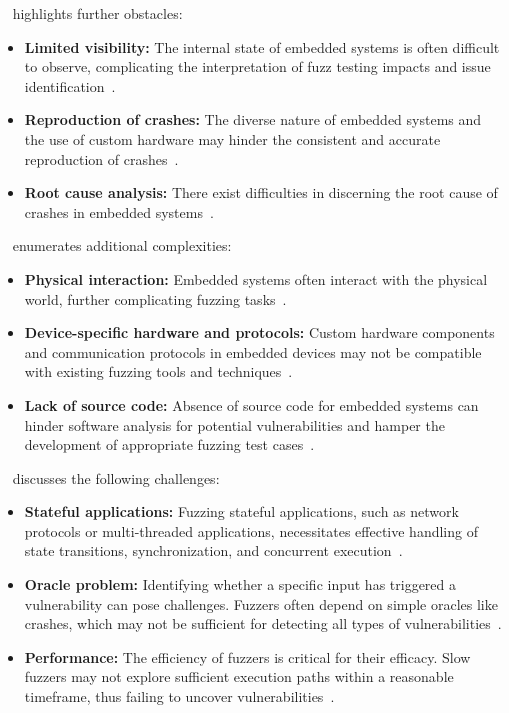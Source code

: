 ~ highlights further obstacles:
\begin{itemize}
\item \textbf{Limited visibility:} The internal state of embedded systems is often difficult to observe, complicating the interpretation of fuzz testing impacts and issue identification~\cite{muench2018you}.
\item \textbf{Reproduction of crashes:} The diverse nature of embedded systems and the use of custom hardware may hinder the consistent and accurate reproduction of crashes~\cite{muench2018you}.
\item \textbf{Root cause analysis:} There exist difficulties in discerning the root cause of crashes in embedded systems~\cite{muench2018you}.
\end{itemize}

~ enumerates additional complexities:
\begin{itemize}
\item \textbf{Physical interaction:} Embedded systems often interact with the physical world, further complicating fuzzing tasks~\cite{eisele2022embedded}.
\item \textbf{Device-specific hardware and protocols:} Custom hardware components and communication protocols in embedded devices may not be compatible with existing fuzzing tools and techniques~\cite{eisele2022embedded}.
\item \textbf{Lack of source code:} Absence of source code for embedded systems can hinder software analysis for potential vulnerabilities and hamper the development of appropriate fuzzing test cases~\cite{eisele2022embedded}.
\end{itemize}

~ discusses the following challenges:
\begin{itemize}
\item \textbf{Stateful applications:} Fuzzing stateful applications, such as network protocols or multi-threaded applications, necessitates effective handling of state transitions, synchronization, and concurrent execution~\cite{manes2019art}.
\item \textbf{Oracle problem:} Identifying whether a specific input has triggered a vulnerability can pose challenges. Fuzzers often depend on simple oracles like crashes, which may not be sufficient for detecting all types of vulnerabilities~\cite{manes2019art}.
\item \textbf{Performance:} The efficiency of fuzzers is critical for their efficacy. Slow fuzzers may not explore sufficient execution paths within a reasonable timeframe, thus failing to uncover vulnerabilities~\cite{manes2019art}.
\end{itemize}

